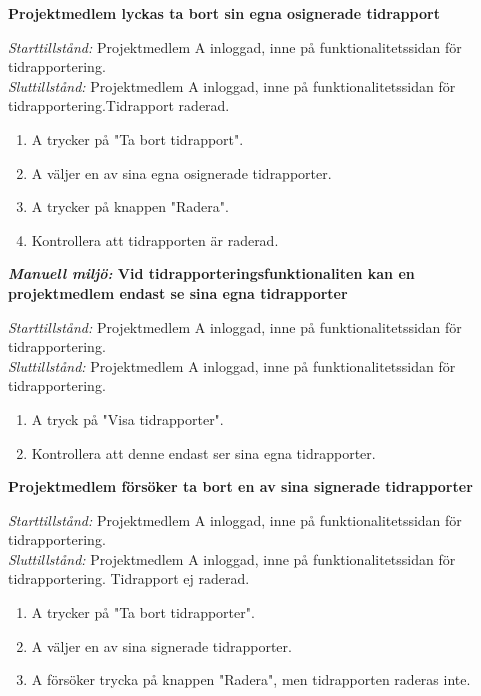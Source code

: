 \documentclass[a4paper]{article}
\begin{document}
\begin{FT}
\item
\textbf{Projektmedlem lyckas ta bort sin egna osignerade tidrapport}

\emph{Starttillstånd:} Projektmedlem A inloggad, inne på funktionalitetssidan för tidrapportering.\\
\emph{Sluttillstånd:} Projektmedlem A inloggad, inne på funktionalitetssidan för tidrapportering.Tidrapport raderad.

\begin{enumerate}
\item A trycker på "Ta bort tidrapport".
\item A väljer en av sina egna osignerade tidrapporter.
\item A trycker på knappen "Radera".
\item Kontrollera att tidrapporten är raderad.
\end{enumerate}

\item
\textbf{\emph{Manuell miljö:} Vid tidrapporteringsfunktionaliten kan en projektmedlem endast se sina egna tidrapporter} 

\emph{Starttillstånd:} Projektmedlem A inloggad, inne på funktionalitetssidan för tidrapportering.\\
\emph{Sluttillstånd:} Projektmedlem A inloggad, inne på funktionalitetssidan för tidrapportering.

\begin{enumerate}
\item A tryck på "Visa tidrapporter".
\item Kontrollera att denne endast ser sina egna tidrapporter.
\end{enumerate}


\item
\textbf{Projektmedlem försöker ta bort en av sina signerade tidrapporter}

\emph{Starttillstånd:} Projektmedlem A inloggad, inne på funktionalitetssidan för tidrapportering.\\
\emph{Sluttillstånd:} Projektmedlem A inloggad, inne på funktionalitetssidan för tidrapportering. Tidrapport ej raderad.

\begin{enumerate}
\item A trycker på "Ta bort tidrapporter".
\item A väljer en av sina signerade tidrapporter.
\item A försöker trycka på knappen "Radera", men tidrapporten raderas inte.
\end{enumerate}


\end{FT}
\end{document}
